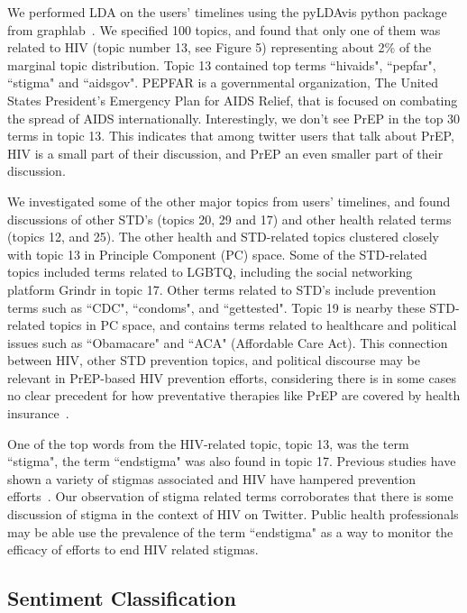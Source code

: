 \documentclass{sig-alternate-05-2015}
\begin{document}
We performed LDA on the users' timelines using the pyLDAvis python package from graphlab~\cite{low2014graphlab}. We specified 100 topics, and found that only one of them was related to HIV (topic number 13, see Figure 5) representing about 2\% of the marginal topic distribution. Topic 13 contained top terms ``hivaids", ``pepfar", ``stigma" and ``aidsgov". PEPFAR is a governmental organization, The United States President's Emergency Plan for AIDS Relief, that is focused on combating the spread of AIDS internationally. Interestingly, we don't see PrEP in the top 30 terms in topic 13. This indicates that among twitter users that talk about PrEP, HIV is a small part of their discussion, and PrEP an even smaller part of their discussion.

We investigated some of the other major topics from users' timelines, and found discussions of other STD's (topics 20, 29 and 17) and other health related terms (topics 12, and 25). The other health and STD-related topics clustered closely with topic 13 in Principle Component (PC) space. Some of the STD-related topics included terms related to LGBTQ, including the social networking platform Grindr in topic 17. Other terms related to STD's include prevention terms such as ``CDC", ``condoms", and ``gettested". Topic 19 is nearby these STD-related topics in PC space, and contains terms related to healthcare and political issues such as ``Obamacare" and ``ACA" (Affordable Care Act). This connection between HIV, other STD prevention topics, and political discourse may be relevant in PrEP-based HIV prevention efforts, considering there is in some cases no clear precedent for how preventative therapies like PrEP are covered by health insurance~\cite{liu2014early}.

One of the top words from the HIV-related topic, topic 13, was the term ``stigma", the term ``endstigma" was also found in topic 17. Previous studies have shown a variety of stigmas associated and HIV have hampered prevention efforts~\cite{liu2014early}. Our observation of stigma related terms corroborates that there is some discussion of stigma in the context of HIV on Twitter. Public health professionals may be able use the prevalence of the term ``endstigma" as a way to monitor the efficacy of efforts to end HIV related stigmas.

\subsection{Sentiment Classification}
\end{document}
